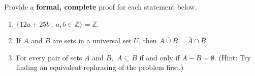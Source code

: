 \documentclass[12pt]{article}
\newcommand{\Z}{\mathbb{Z}}
\begin{document}
Provide a \textbf{formal, complete} proof for each statement below.
\begin{enumerate}
\item $\{12a+25b \: : \: a,b \in \Z\} = \Z.$
\vfill

\item If $A$ and $B$ are sets in a universal set $U$, then $\overline{A \cup B}=\overline{A} \cap \overline{B}.$ 
\vfill

\vfill

\newpage
\item For every pair of sets $A$ and $B,$  $A \subseteq B$ if and only if $A-B = \emptyset.$ (Hint: Try finding an equivalent rephrasing of the problem first.)

\end{enumerate}
\end{document}
